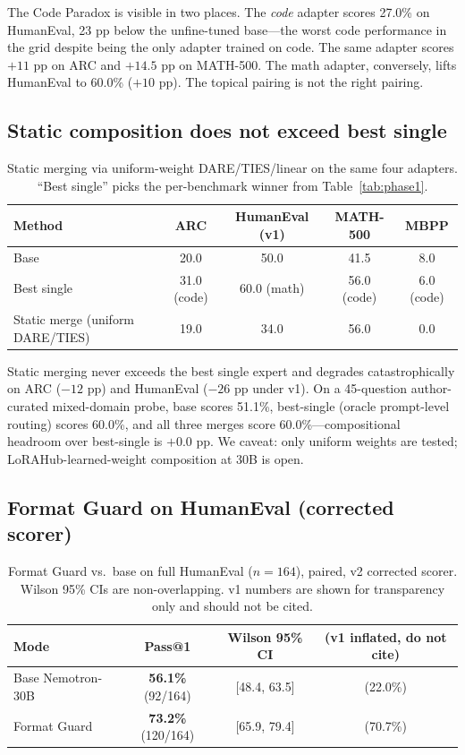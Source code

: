 \documentclass{article}
\begin{document}
The Code Paradox is visible in two places. The \emph{code} adapter scores 27.0\% on HumanEval, 23 pp below the unfine-tuned base---the worst code performance in the grid despite being the only adapter trained on code. The same adapter scores $+11$ pp on ARC and $+14.5$ pp on MATH-500. The math adapter, conversely, lifts HumanEval to 60.0\% ($+10$ pp). The topical pairing is not the right pairing.

\subsection{Static composition does not exceed best single}
\label{sec:static}

\begin{table}[h]
  \caption{Static merging via uniform-weight DARE/TIES/linear on the same four adapters. ``Best single'' picks the per-benchmark winner from Table~\ref{tab:phase1}.}
  \label{tab:static}
  \centering
  \small
  \begin{tabular}{lcccc}
    \toprule
    Method & ARC & HumanEval (v1) & MATH-500 & MBPP \\
    \midrule
    Base                              & 20.0 & 50.0 & 41.5 & 8.0 \\
    Best single                       & 31.0 (code) & 60.0 (math) & 56.0 (code) & 6.0 (code) \\
    Static merge (uniform DARE/TIES)  & 19.0 & 34.0 & 56.0 & 0.0 \\
    \bottomrule
  \end{tabular}
\end{table}

Static merging never exceeds the best single expert and degrades catastrophically on ARC ($-12$ pp) and HumanEval ($-26$ pp under v1). On a 45-question author-curated mixed-domain probe, base scores 51.1\%, best-single (oracle prompt-level routing) scores 60.0\%, and all three merges score 60.0\%---compositional headroom over best-single is $+0.0$ pp. We caveat: only uniform weights are tested; LoRAHub-learned-weight composition at 30B is open.

\subsection{Format Guard on HumanEval (corrected scorer)}
\label{sec:humaneval}

\begin{table}[h]
  \caption{Format Guard vs.\ base on full HumanEval ($n=164$), paired, v2 corrected scorer. Wilson 95\% CIs are non-overlapping. v1 numbers are shown for transparency only and should not be cited.}
  \label{tab:humaneval}
  \centering
  \small
  \begin{tabular}{lccc}
    \toprule
    Mode & Pass@1 & Wilson 95\% CI & (v1 inflated, do not cite) \\
    \midrule
    Base Nemotron-30B & \textbf{56.1\%} (92/164)  & [48.4, 63.5] & (22.0\%) \\
    Format Guard      & \textbf{73.2\%} (120/164) & [65.9, 79.4] & (70.7\%) \\
    \bottomrule
  \end{tabular}
\end{table}
\end{document}

